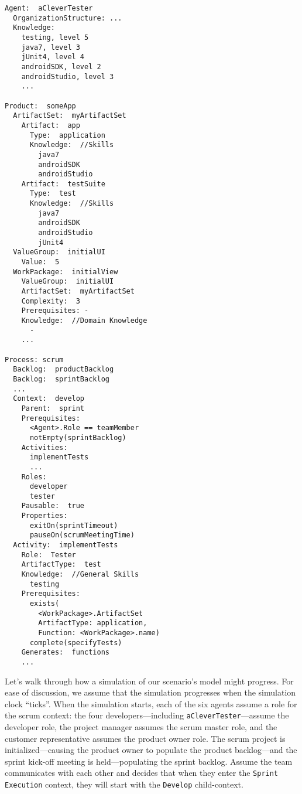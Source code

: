 \begin{lstlisting}[float, caption={A subset of our scenario's input
expressed using the reference model.}] 
Agent:  aCleverTester 
  OrganizationStructure: ...
  Knowledge:
    testing, level 5
    java7, level 3
    jUnit4, level 4
    androidSDK, level 2
    androidStudio, level 3
    ...
    
Product:  someApp
  ArtifactSet:  myArtifactSet
    Artifact:  app
      Type:  application
      Knowledge:  //Skills
        java7
        androidSDK
        androidStudio
    Artifact:  testSuite
      Type:  test
      Knowledge:  //Skills
        java7
        androidSDK
        androidStudio
        jUnit4
  ValueGroup:  initialUI
    Value:  5
  WorkPackage:  initialView
    ValueGroup:  initialUI
    ArtifactSet:  myArtifactSet
    Complexity:  3
    Prerequisites: -
    Knowledge:  //Domain Knowledge
      -
    ...
    
Process: scrum
  Backlog:  productBacklog
  Backlog:  sprintBacklog
  ...
  Context:  develop
    Parent:  sprint
    Prerequisites:
      <Agent>.Role == teamMember
      notEmpty(sprintBacklog)
    Activities:
      implementTests
      ...
    Roles:  
      developer  
      tester
    Pausable:  true
    Properties:
      exitOn(sprintTimeout)
      pauseOn(scrumMeetingTime)
  Activity:  implementTests
    Role:  Tester
    ArtifactType:  test
    Knowledge:  //General Skills
      testing
    Prerequisites:
      exists(
        <WorkPackage>.ArtifactSet
        ArtifactType: application,
        Function: <WorkPackage>.name)
      complete(specifyTests)
    Generates:  functions
    ...
\end{lstlisting}

Let's walk through how a simulation of our scenario's model might progress. 
For ease of discussion, we assume that the simulation progresses when the
simulation clock ``ticks''.
When the simulation starts, each of the six agents assume a role for the scrum context: the four developers---including \texttt{aCleverTester}---assume the
developer role, the project manager assumes the scrum master role, and the
customer representative assumes the product owner role.
The scrum project is initialized---causing the product owner to populate the
product backlog---and the sprint kick-off meeting is held---populating the
sprint backlog.  Assume the team communicates with each other and decides that
when they enter the \texttt{Sprint Execution} context, they will start with the
\texttt{Develop} child-context.

